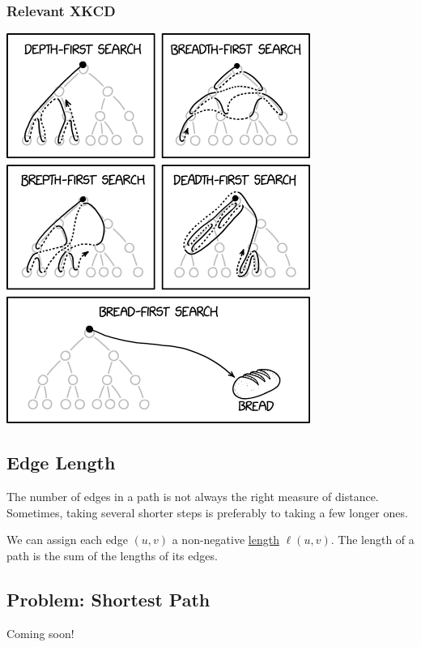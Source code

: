 \documentclass[letterpaper]{article}
\begin{document}
\subsubsection{Relevant XKCD}
\begin{center}
    \includegraphics[scale=0.7]{../assets/xkcd_depth_and_breadth.png}
\end{center}

\subsection{Edge Length}
The number of edges in a path is not always the right measure of distance. Sometimes, taking several shorter steps is preferably to taking a few longer ones. 

\bigskip 

We can assign each edge $(u, v)$ a non-negative \underline{length} $\ell(u, v)$. The length of a path is the sum of the lengths of its edges.

\subsection{Problem: Shortest Path}
Coming soon!
\end{document}
